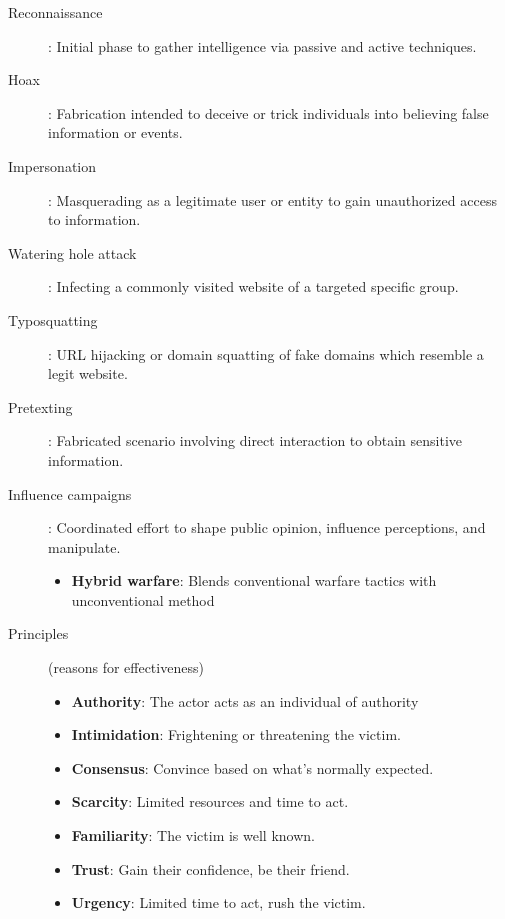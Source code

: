 \begin{fullwidth}
\begin{description}
        \item[Reconnaissance]: Initial phase to gather intelligence via passive and active techniques.
        \item[Hoax]: Fabrication intended to deceive or trick individuals into believing false information or events.
        \item[Impersonation]: Masquerading as a legitimate user or entity to gain unauthorized access to information.
        \item[Watering hole attack]: Infecting a commonly visited website of a targeted specific group.
        \item[Typosquatting]: URL hijacking or domain squatting of fake domains which resemble a legit website.
        \item[Pretexting]: Fabricated scenario involving direct interaction to obtain sensitive information.
        \item[Influence campaigns]: Coordinated effort to shape public opinion, influence perceptions, and manipulate.
        \begin{itemize}\itemsep2pt
            \item[]\textbf{Hybrid warfare}: Blends conventional warfare tactics with unconventional method
        \end{itemize}
        \item[Principles] (reasons for effectiveness)
        \begin{itemize}\itemsep2pt
            \item \textbf{Authority}: The actor acts as an individual of authority
            \item \textbf{Intimidation}: Frightening or threatening the victim.
            \item \textbf{Consensus}: Convince based on what’s normally expected.
            \item \textbf{Scarcity}: Limited resources and time to act.
            \item \textbf{Familiarity}: The victim is well known.
            \item \textbf{Trust}: Gain their confidence, be their friend.
            \item \textbf{Urgency}: Limited time to act, rush the victim.
        \end{itemize}
    \end{description}
\end{fullwidth}

\newpage